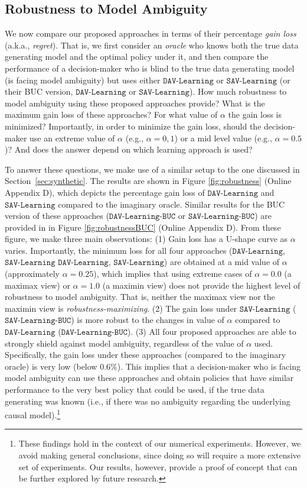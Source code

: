 \documentclass[opre,nonblindrev]{informs2}%
\newcommand{\1}{\hbox{\rm 1\kern-.35em 1}}
\newcommand{\SAV}{\texttt{SAV-Learning}}
\newcommand{\DAV}{\texttt{DAV-Learning}}
\newcommand{\SAVBUC}{\texttt{SAV-Learning-BUC}}
\newcommand{\DAVBUC}{\texttt{DAV-Learning-BUC}}
\begin{document}
\subsection{Robustness to Model Ambiguity}\label{sec:robsutness}
We now compare our proposed approaches in terms of their percentage {\em gain loss} (a.k.a., {\em regret}). That is, we first consider an {\em oracle} who knows both the true data generating model and the optimal policy under it, and then compare the performance of a decision-maker who is blind to the true data generating model (is facing model ambiguity) but uses either  $\DAV$ or $\SAV$ (or their BUC version, $\DAV$ or $\SAV$).  How much robustness to model ambiguity using  these proposed approaches provide? What is the maximum gain loss of these approaches? For what value of $\alpha$ the gain loss is minimized? Importantly, in order to minimize the gain loss, should the decision-maker use an extreme value of $\alpha$ (e.g., $\alpha=0,1$) or a mid level value (e.g., $\alpha=0.5$)? And does the answer depend on which learning approach is used?




To answer these  questions, we make use of a similar setup to the one discussed in Section~\ref{sec:synthetic}. The results are shown in Figure \ref{fig:robustness} (Online Appendix D), which depicts the percentage gain loss of  $\DAV$ and  $\SAV$  compared to the imaginary oracle. Similar results for the BUC version of these approaches ($\DAVBUC$ or $\SAVBUC$) are provided in  in Figure \ref{fig:robustnessBUC} (Online Appendix D). From these figure, we make three main observations: (1) Gain loss  has a U-shape curve as $\alpha$ varies. Importantly, the minimum loss for all four approaches ($\DAV$, $\SAV$ $\DAV$, $\SAV$)  are obtained at a mid value of $\alpha$ (approximately $\alpha=0.25$), which implies that using extreme cases of $\alpha=0.0$ (a maximax view) or $\alpha=1.0$ (a maximin view) does not provide the highest level of robustness to model ambiguity. That is, neither the maximax view nor the maximin view is {\em robustness-maximizing}. (2) The gain loss under $\SAV$ ($\SAVBUC$) is more robust to the changes in value of $\alpha$ compared to $\DAV$ ($\DAVBUC$). (3) All four proposed approaches are able to strongly shield against model ambiguity, regardless of the value of  $\alpha$ used. Specifically, the gain loss under these approaches (compared to the imaginary oracle) is very low (below $0.6\%$). This implies that a decision-maker who is facing model ambiguity can use these approaches and obtain  policies that have similar performance to the very best policy that could be used, if  the true data generating was known (i.e., if there was no ambiguity regarding the underlying causal model).\footnote{These findings hold in the context of our numerical experiments. However, we avoid making general conclusions, since doing so will require a more extensive set of experiments. Our results, however, provide a proof of concept that can be further explored by future research.}
\end{document}
